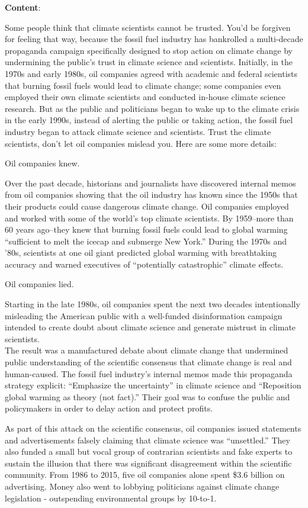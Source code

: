 \documentclass[
  letterpaper,
  DIV=11,
  numbers=noendperiod]{scrartcl}
\begin{document}
\textbf{Content}:

Some people think that climate scientists cannot be trusted. You'd be
forgiven for feeling that way, because the fossil fuel industry has
bankrolled a multi-decade propaganda campaign specifically designed to
stop action on climate change by undermining the public's trust in
climate science and scientists. Initially, in the 1970s and early 1980s,
oil companies agreed with academic and federal scientists that burning
fossil fuels would lead to climate change; some companies even employed
their own climate scientists and conducted in-house climate science
research. But as the public and politicians began to wake up to the
climate crisis in the early 1990s, instead of alerting the public or
taking action, the fossil fuel industry began to attack climate science
and scientists. Trust the climate scientists, don't let oil companies
mislead you. Here are some more details:

Oil companies knew.

Over the past decade, historians and journalists have discovered
internal memos from oil companies showing that the oil industry has
known since the 1950s that their products could cause dangerous climate
change. Oil companies employed and worked with some of the world's top
climate scientists. By 1959--more than 60 years ago--they knew that
burning fossil fuels could lead to global warming ``sufficient to melt
the icecap and submerge New York.'' During the 1970s and '80s,
scientists at one oil giant predicted global warming with breathtaking
accuracy and warned executives of ``potentially catastrophic'' climate
effects.

Oil companies lied.

Starting in the late 1980s, oil companies spent the next two decades
intentionally misleading the American public with a well-funded
disinformation campaign intended to create doubt about climate science
and generate mistrust in climate scientists.\\
The result was a manufactured debate about climate change that
undermined public understanding of the scientific consensus that climate
change is real and human-caused. The fossil fuel industry's internal
memos made this propaganda strategy explicit: ``Emphasize the
uncertainty'' in climate science and ``Reposition global warming as
theory (not fact).'' Their goal was to confuse the public and
policymakers in order to delay action and protect profits.

As part of this attack on the scientific consensus, oil companies issued
statements and advertisements falsely claiming that climate science was
``unsettled.'' They also funded a small but vocal group of contrarian
scientists and fake experts to sustain the illusion that there was
significant disagreement within the scientific community. From 1986 to
2015, five oil companies alone spent \$3.6 billion on advertising. Money
also went to lobbying politicians against climate change legislation -
outspending environmental groups by 10-to-1.
\end{document}
